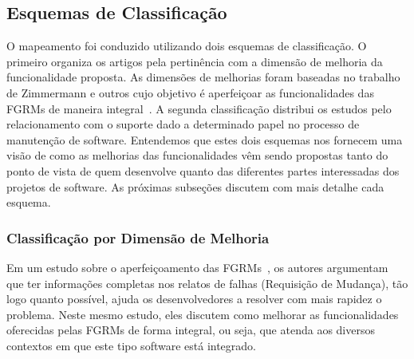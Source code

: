 \subsection{Esquemas de Classificação}
\label{subsec:map-esquemas-classificacao}

O mapeamento foi conduzido utilizando dois esquemas de classificação. O primeiro
organiza os artigos pela pertinência com a dimensão de melhoria da
funcionalidade proposta. As dimensões de melhorias foram baseadas no trabalho de
Zimmermann e outros cujo objetivo é aperfeiçoar as funcionalidades das FGRMs de
maneira integral~\cite{zimmermann2009improving}. A segunda classificação
distribui os estudos pelo relacionamento com o suporte dado a determinado papel
no processo de manutenção de software. Entendemos que estes dois esquemas nos
fornecem uma visão de como as melhorias das funcionalidades vêm sendo propostas
tanto do ponto de vista de quem desenvolve quanto das diferentes partes
interessadas dos projetos de software. As pró\-xi\-mas subseções discutem com
mais detalhe cada esquema.

\subsubsection{Classificação por Dimensão de Melhoria}
\label{subsubsec:map-esquema-suporte-problema}

Em um estudo sobre o aperfeiçoamento das FGRMs~\cite{zimmermann2009improving},
os autores argumentam que ter informações completas nos relatos de falhas
(Requisição de Mudança), tão logo quanto possível, ajuda os desenvolvedores a
resolver com mais rapidez o problema. Neste mesmo estudo, eles discutem como
melhorar as funcionalidades oferecidas pelas FGRMs de forma integral, ou seja,
que atenda aos diversos contextos em que este tipo software está integrado.


